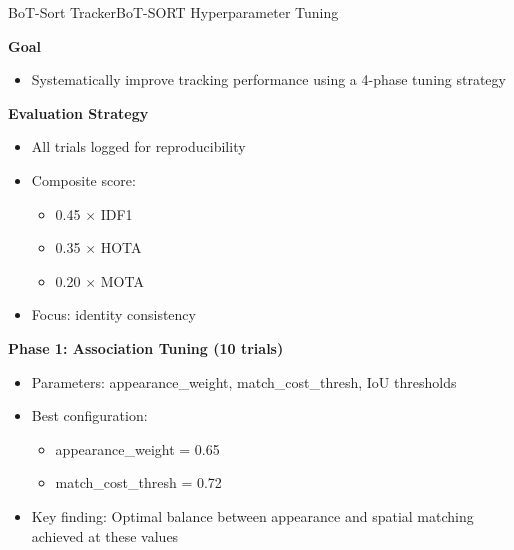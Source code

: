 \documentclass[10pt]{beamer}
\begin{document}
\begin{frame}{BoT-Sort Tracker}{BoT-SORT Hyperparameter Tuning}
	
	\textbf{Goal}
	\begin{itemize}
		\item Systematically improve tracking performance using a 4-phase tuning strategy
	\end{itemize}
	
	\textbf{Evaluation Strategy}
	\begin{itemize}
		\item All trials logged for reproducibility
		\item Composite score:
		\begin{itemize}
			\item 0.45 $\times$ IDF1
			\item 0.35 $\times$ HOTA
			\item 0.20 $\times$ MOTA
		\end{itemize}
		\item Focus: identity consistency
	\end{itemize}
	
	\textbf{Phase 1: Association Tuning (10 trials)}
	\begin{itemize}
		\item Parameters: appearance\_weight, match\_cost\_thresh, IoU thresholds
		\item Best configuration:
		\begin{itemize}
			\item appearance\_weight = 0.65
			\item match\_cost\_thresh = 0.72
		\end{itemize}
		\item Key finding: Optimal balance between appearance and spatial matching achieved at these values
	\end{itemize}
	
\end{frame}
\end{document}
